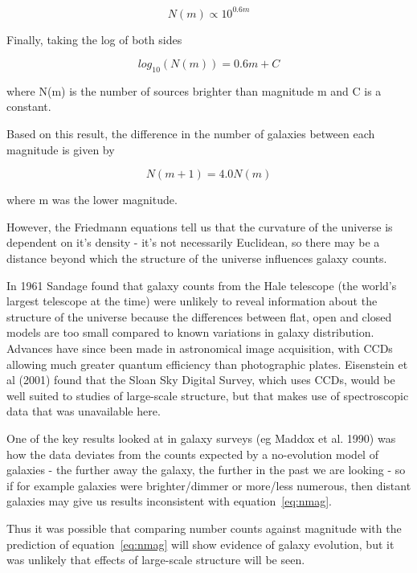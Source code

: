 \documentclass[a4paper,11pt,twoside]{article}
\begin{document}
\begin{equation}
N(m) \propto 10^{0.6m}
\end{equation}

Finally, taking the log of both sides

\begin{equation}
\label{eq:nmag}
log_{10}(N(m)) = 0.6m + C
\end{equation}

where N(m) is the number of sources brighter than magnitude m and 
C is a constant.

Based on this result, the difference in the number of galaxies between
each magnitude is given by

\begin{equation}
N(m+1) = 4.0N(m)
\end{equation}

where m was the lower magnitude.

However, the Friedmann equations tell us that the curvature of the 
universe is dependent on it's density - it's not necessarily Euclidean,
so there may be a distance beyond which the structure of the universe 
influences galaxy counts.

In 1961 Sandage \cite{sandage} found that galaxy counts from the Hale telescope 
(the world's largest telescope at the time\cite{hale}) were unlikely to 
reveal information about the structure of the universe because 
the differences between flat, open and closed models are too small compared 
to known variations in galaxy distribution. Advances have since been 
made in astronomical image acquisition, with CCDs allowing much greater 
quantum efficiency than photographic plates. Eisenstein et al (2001)\cite{eisen} 
found that the Sloan Sky Digital Survey, which uses CCDs, would be 
well suited to studies of large-scale structure, but that makes use 
of spectroscopic data that was unavailable here.

One of the key results looked at in galaxy surveys 
(eg Maddox et al. 1990)\cite{maddox} was how the data deviates from 
the counts expected by a no-evolution model of galaxies - the further 
away the galaxy, the further in the past we are looking - so if for 
example galaxies were brighter/dimmer or more/less numerous, then 
distant galaxies may give us results inconsistent with equation~\ref{eq:nmag}.

Thus it was possible that comparing number counts against magnitude 
with the prediction of equation~\ref{eq:nmag} will show evidence of 
galaxy evolution, but it was unlikely that effects of large-scale
structure will be seen.
\end{document}

